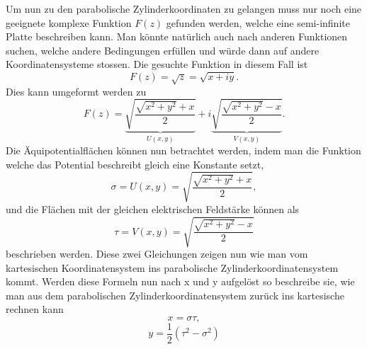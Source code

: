 Um nun zu den parabolische Zylinderkoordinaten zu gelangen muss nur noch eine geeignete komplexe Funktion $F(z)$ gefunden werden, welche eine semi-infinite Platte beschreiben kann. Man könnte natürlich auch nach anderen Funktionen suchen, welche andere Bedingungen erfüllen und würde dann auf andere Koordinatensysteme stossen. Die gesuchte Funktion in diesem Fall ist
\begin{equation}
	F(z) 
	= 
	\sqrt{z} 
	= 
	\sqrt{x + iy}.
\end{equation}
Dies kann umgeformt werden zu
\begin{equation}
	F(z) 
	= 
	\underbrace{\sqrt{\frac{\sqrt{x^2+y^2} + x}{2}}}_{U(x,y)} 
	+ 
	i\underbrace{\sqrt{\frac{\sqrt{x^2+y^2} - x}{2}}}_{V(x,y)}
	.
\end{equation}
Die Äquipotentialflächen können nun betrachtet werden, indem man die Funktion welche das Potential beschreibt gleich eine Konstante setzt,
\begin{equation}
	\sigma = U(x,y) = \sqrt{\frac{\sqrt{x^2+y^2} + x}{2}},
\end{equation}
und die Flächen mit der gleichen elektrischen Feldstärke können als
\begin{equation}
	\tau = V(x,y) = \sqrt{\frac{\sqrt{x^2+y^2} - x}{2}}
\end{equation}
beschrieben werden. Diese zwei Gleichungen zeigen nun wie man vom kartesischen Koordinatensystem ins parabolische Zylinderkoordinatensystem kommt. Werden diese Formeln nun nach x und y aufgelöst so beschreibe sie, wie man aus dem parabolischen Zylinderkoordinatensystem zurück ins kartesische rechnen kann
\begin{equation}
	x = \sigma \tau,
\end{equation}
\begin{equation}
	y = \frac{1}{2}\left ( \tau^2 - \sigma^2 \right )
\end{equation}





